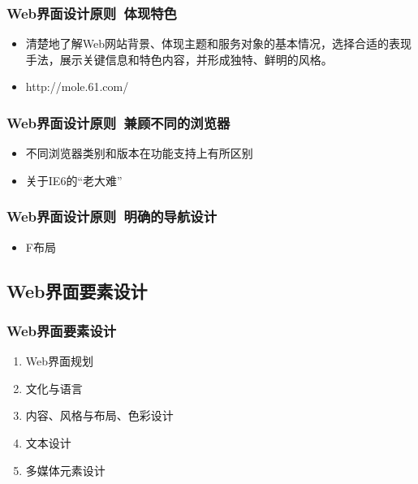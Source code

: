 \documentclass{beamer}
\newcommand{\fullPageImage}[2]{
	{
		\usebackgroundtemplate{\texttt{[image: \#1]}}
		\frame[plain]{#2}
	}
}
\begin{document}
\begin{frame}
	\frametitle{Web界面设计原则~{\small 体现特色}}
	\beamertemplatetransparentcovereddynamicmedium
	\begin{itemize}
		\item 清楚地了解Web网站背景、体现主题和服务对象的基本情况，选择合适的表现手法，展示关键信息和特色内容，并形成独特、鲜明的风格。
		\pause
		\item http://mole.61.com/
	\end{itemize}
\end{frame}

\begin{frame}
	\frametitle{Web界面设计原则~{\small 兼顾不同的浏览器}}
	\beamertemplatetransparentcovereddynamicmedium
	\begin{itemize}
		\item 不同浏览器类别和版本在功能支持上有所区别
		\pause
		\item 关于IE6的“老大难”
	\end{itemize}
\end{frame}

\begin{frame}
	\frametitle{Web界面设计原则~{\small 明确的导航设计}}
	\beamertemplatetransparentcovereddynamicmedium
	\begin{itemize}[<+->]
		\item F布局
	\end{itemize}
\end{frame}

\fullPageImage{images/heatmap.jpg}{}
\fullPageImage{images/f-wireframe.jpg}{}

\subsection{Web界面要素设计}
\begin{frame}
	\frametitle{Web界面要素设计}
	\beamertemplatetransparentcovereddynamicmedium
	\begin{enumerate}[<+->]
		\item Web界面规划
		\item 文化与语言
		\item 内容、风格与布局、色彩设计
		\item 文本设计
		\item 多媒体元素设计
	\end{enumerate}
\end{frame}
\end{document}
